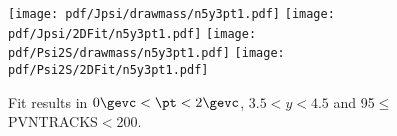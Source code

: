 \begin{figure}[H]
\begin{center}
\texttt{[image: pdf/Jpsi/drawmass/n5y3pt1.pdf]}
\texttt{[image: pdf/Jpsi/2DFit/n5y3pt1.pdf]}
\vspace*{-0.5cm}
\texttt{[image: pdf/Psi2S/drawmass/n5y3pt1.pdf]}
\texttt{[image: pdf/Psi2S/2DFit/n5y3pt1.pdf]}
\vspace*{-0.5cm}
\end{center}
\caption{Fit results in $0\gevc<\pt<2\gevc$, $3.5<y<4.5$ and 95$\leq$PVNTRACKS$<$200.}
\label{Fitn5y3pt1}
\end{figure}
